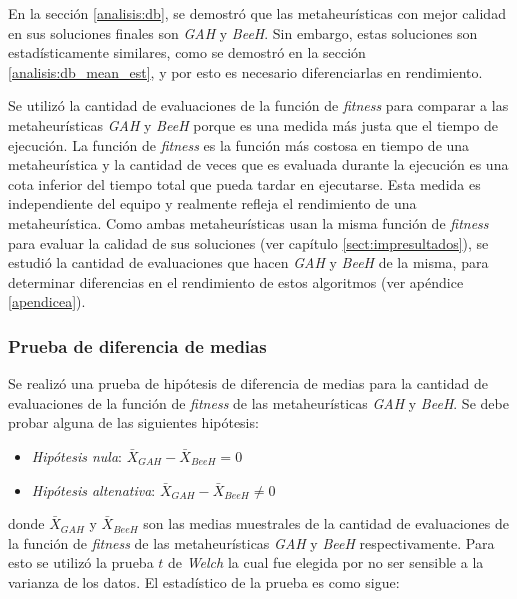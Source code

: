     En la sección \ref{analisis:db}, se demostró que las metaheurísticas con 
mejor calidad en sus soluciones finales son \emph{GAH} y \emph{BeeH}. Sin
embargo, estas soluciones son estadísticamente similares, como se demostró en la
sección \ref{analisis:db_mean_est}, y por esto es necesario diferenciarlas
en rendimiento.

    Se utilizó la cantidad de evaluaciones de la función de \emph{fitness}
para comparar a las metaheurísticas \emph{GAH} y \emph{BeeH} porque es una
medida más justa que el tiempo de ejecución. La función de \emph{fitness} es la
función más costosa en tiempo de una metaheurística y la cantidad de veces que es
evaluada durante la ejecución es una cota inferior del tiempo total que pueda
tardar en ejecutarse. Esta medida es independiente del equipo y realmente
refleja el rendimiento de una metaheurística. Como ambas metaheurísticas usan la
misma función de \emph{fitness} para evaluar la calidad de sus soluciones (ver
capítulo \ref{sect:impresultados}), se estudió la cantidad de evaluaciones que
hacen \emph{GAH} y \emph{BeeH} de la misma, para determinar diferencias en el
rendimiento de estos algoritmos (ver apéndice \ref{apendicea}).

\subsubsection{Prueba de diferencia de medias}\label{analisis:eval_mean_hip}

    Se realizó una prueba de hipótesis de diferencia de medias para la cantidad
de evaluaciones de la función de \emph{fitness} de las metaheurísticas \emph{GAH}
y \emph{BeeH}. Se debe probar alguna de las siguientes hipótesis:
\begin{itemize}
    \item \emph{Hipótesis nula}: $\bar{X}_{GAH} - \bar{X}_{BeeH} = 0$
    \item \emph{Hipótesis altenativa}: $\bar{X}_{GAH} - \bar{X}_{BeeH} \neq 0$
\end{itemize}
donde $\bar{X}_{GAH}$ y $\bar{X}_{BeeH}$ son las medias muestrales de la
cantidad de evaluaciones de la función de \emph{fitness} de las metaheurísticas
\emph{GAH} y \emph{BeeH} respectivamente.
\newpage
    Para esto se utilizó la prueba $t$ de \emph{Welch} \cite{AB_0} la cual fue
elegida por no ser sensible a la varianza de los datos. El estadístico de la
prueba es como sigue:

